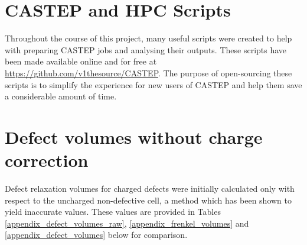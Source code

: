 \documentclass[a4paper,12pt,twoside]{report}
\begin{document}
\chapter{CASTEP and HPC Scripts}
\label{castep_scripts}

Throughout the course of this project, many useful scripts were created to help with preparing CASTEP jobs and analysing their outputs. These scripts have been made available online and for free at \href{https://github.com/v1thesource/CASTEP}{https://github.com/v1thesource/CASTEP}. The purpose of open-sourcing these scripts is to simplify the experience for new users of CASTEP and help them save a considerable amount of time.

\chapter{Defect volumes without charge correction} \label{uncorrected_volumes}

Defect relaxation volumes for charged defects were initially calculated only with respect to the uncharged non-defective cell, a method which has been shown to yield inaccurate values. These values are provided in Tables \ref{appendix_defect_volumes_raw}, \ref{appendix_frenkel_volumes} and \ref{appendix_defect_volumes} below for comparison.
\end{document}
